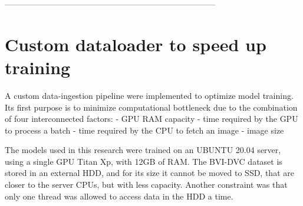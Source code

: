% 
% 
% 
% 

-----------------------------------------------------------------------------

\section{Custom dataloader to speed up training}
\label{sec:custom-dataloader}

A custom data-ingestion pipeline were implemented to optimize model training.
Its first purpose is to minimize computational bottleneck due to the combination of four interconnected factors:
- GPU RAM capacity
- time required by the GPU to process a batch
- time required by the CPU to fetch an image
- image size

The models used in this research were trained on an UBUNTU 20.04 server, using a single GPU Titan Xp, with 12GB of RAM. The BVI-DVC dataset is stored in an external HDD, and for its size it cannot be moved to SSD, that are closer to the server CPUs, but with less capacity. Another constraint was that only one thread was allowed to access data in the HDD a time.

